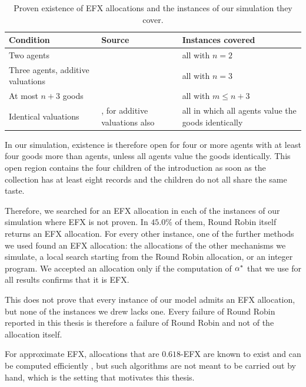 \begin{table}[ht]
  \centering
  \caption{Proven existence of EFX allocations and the instances of our simulation they cover.}
  \label{tab:existence}
  \small
  \begin{tabular}{p{4.2cm}p{5.2cm}p{3.8cm}}
    \toprule
    Condition & Source & Instances covered \\
    \midrule
    Two agents & \textcite[Thm.~4.3]{plaut2020} & all with $n=2$ \\
    Three agents, additive valuations & \textcite[Thm.~20]{chaudhury2024} & all with $n=3$ \\
    At most $n+3$ goods & \textcite[Thm.~3]{mahara2024general} & all with $m\leq n+3$ \\
    Identical valuations & \textcite[Thm.~4.2]{plaut2020}, for additive valuations also
      \textcite[Prop.~1]{branzei2025} & all in which all agents value the goods identically \\
    \bottomrule
  \end{tabular}
\end{table}

In our simulation, existence is therefore open for four or more agents with at least four goods more
than agents, unless all agents value
the goods identically. This open region contains the four children of the introduction as soon as the
collection has at least eight records and the children do not all share the same taste.

Therefore, we searched for an EFX allocation in each of the instances of our
simulation where EFX is not proven. In $45.0\%$ of them, Round Robin itself returns an EFX allocation. For every other
instance, one of the further methods we used found an EFX allocation: the allocations of the other
mechanisms we simulate, a local search starting from the Round Robin allocation, or an integer
program. We accepted an allocation only if the computation of $\alpha^{*}$ that we use for all results
confirms that it is EFX.

This does not prove that every instance of our model admits an EFX allocation, but none of the
instances we drew lacks one. Every failure of Round Robin reported in this thesis is therefore a
failure of Round Robin and not of the allocation itself.

For approximate EFX, allocations that are $0.618$-EFX are known to exist and can be computed
efficiently \parencite[Thm.~4.4]{amanatidis2020multiple}, but such algorithms are not meant to be
carried out by hand, which is the setting that motivates this thesis.

